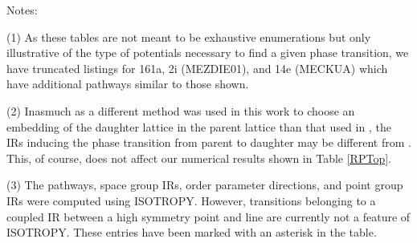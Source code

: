 \documentclass[preprint]{iucr}              %
\begin{document}
Notes: 

(1) As these tables are not meant to be exhaustive enumerations but only illustrative of the type of potentials necessary to find a given phase transition, we have truncated listings for 161a, 2i (MEZDIE01), and 14e (MECKUA) which have additional pathways similar to those shown. 

(2) Inasmuch as a different method was used in this work to choose an embedding of the daughter lattice in the parent lattice than that used in \cite{McClurg09}, the IRs inducing the phase transition from parent to daughter may be different from \cite{McClurg09}.  This, of course, does not affect our numerical results shown in Table \ref{RPTop}.

(3)  The pathways, space group IRs, order parameter directions, and point group IRs were computed using ISOTROPY.
However, transitions belonging to a coupled IR between a high symmetry point and line
are currently not a feature of ISOTROPY.  These entries have been marked with an asterisk in
the table.

\end{document}
